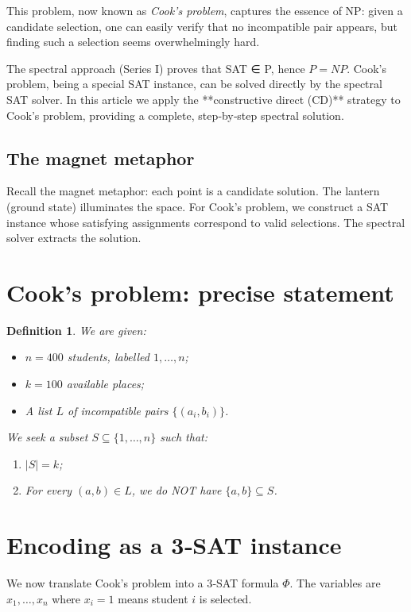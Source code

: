 \documentclass[11pt,a4paper]{article}
\newtheorem{definition}[theorem]{Definition}
\begin{document}
This problem, now known as \emph{Cook's problem}, captures the essence of NP: given a candidate selection, one can easily verify that no incompatible pair appears, but finding such a selection seems overwhelmingly hard.

The spectral approach (Series I) proves that SAT ∈ P, hence \(P = NP\). Cook's problem, being a special SAT instance, can be solved directly by the spectral SAT solver. In this article we apply the **constructive direct (CD)** strategy to Cook's problem, providing a complete, step‑by‑step spectral solution.

\subsection{The magnet metaphor}

Recall the magnet metaphor: each point is a candidate solution. The lantern (ground state) illuminates the space. For Cook's problem, we construct a SAT instance whose satisfying assignments correspond to valid selections. The spectral solver extracts the solution.

\section{Cook's problem: precise statement}

\begin{definition}
We are given:
\begin{itemize}
\item \(n = 400\) students, labelled \(1,\ldots,n\);
\item \(k = 100\) available places;
\item A list \(L\) of incompatible pairs \(\{(a_i,b_i)\}\).
\end{itemize}
We seek a subset \(S\subseteq \{1,\ldots,n\}\) such that:
\begin{enumerate}
\item \(|S| = k\);
\item For every \((a,b)\in L\), we do NOT have \(\{a,b\}\subseteq S\).
\end{enumerate}
\end{definition}

\section{Encoding as a 3‑SAT instance}

We now translate Cook's problem into a 3‑SAT formula \(\Phi\). The variables are \(x_1,\dots,x_n\) where \(x_i = 1\) means student \(i\) is selected.
\end{document}

